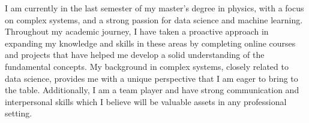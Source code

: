 \documentclass[9pt, purple]{./template/cv} %
\begin{document}

I am currently in the last semester of my master's degree in physics, with a focus on complex systems, and a strong passion for data science and machine learning. Throughout my academic journey, I have taken a proactive approach in expanding my knowledge and skills in these areas by completing online courses and projects that have helped me develop a solid understanding of the fundamental concepts. My background in complex systems, closely related to data science, provides me with a unique perspective that I am eager to bring to the table. 
Additionally, I am a team player and have strong communication and interpersonal skills which I believe will be valuable assets in any professional setting.
\vspace{-3mm}

\end{document}
